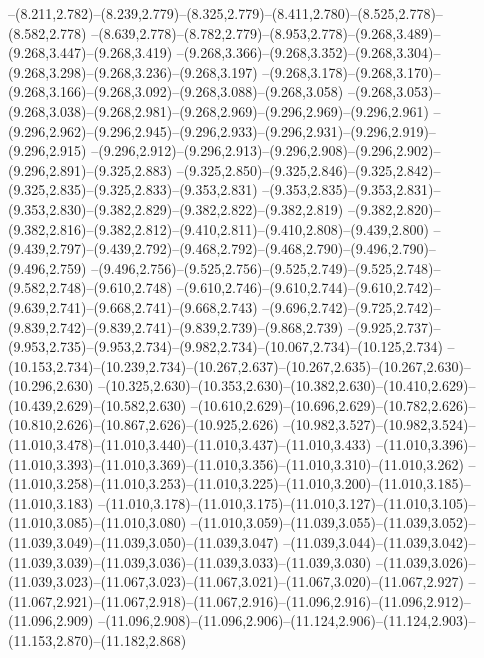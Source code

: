   --(8.211,2.782)--(8.239,2.779)--(8.325,2.779)--(8.411,2.780)--(8.525,2.778)--(8.582,2.778)%
  --(8.639,2.778)--(8.782,2.779)--(8.953,2.778)--(9.268,3.489)--(9.268,3.447)--(9.268,3.419)%
  --(9.268,3.366)--(9.268,3.352)--(9.268,3.304)--(9.268,3.298)--(9.268,3.236)--(9.268,3.197)%
  --(9.268,3.178)--(9.268,3.170)--(9.268,3.166)--(9.268,3.092)--(9.268,3.088)--(9.268,3.058)%
  --(9.268,3.053)--(9.268,3.038)--(9.268,2.981)--(9.268,2.969)--(9.296,2.969)--(9.296,2.961)%
  --(9.296,2.962)--(9.296,2.945)--(9.296,2.933)--(9.296,2.931)--(9.296,2.919)--(9.296,2.915)%
  --(9.296,2.912)--(9.296,2.913)--(9.296,2.908)--(9.296,2.902)--(9.296,2.891)--(9.325,2.883)%
  --(9.325,2.850)--(9.325,2.846)--(9.325,2.842)--(9.325,2.835)--(9.325,2.833)--(9.353,2.831)%
  --(9.353,2.835)--(9.353,2.831)--(9.353,2.830)--(9.382,2.829)--(9.382,2.822)--(9.382,2.819)%
  --(9.382,2.820)--(9.382,2.816)--(9.382,2.812)--(9.410,2.811)--(9.410,2.808)--(9.439,2.800)%
  --(9.439,2.797)--(9.439,2.792)--(9.468,2.792)--(9.468,2.790)--(9.496,2.790)--(9.496,2.759)%
  --(9.496,2.756)--(9.525,2.756)--(9.525,2.749)--(9.525,2.748)--(9.582,2.748)--(9.610,2.748)%
  --(9.610,2.746)--(9.610,2.744)--(9.610,2.742)--(9.639,2.741)--(9.668,2.741)--(9.668,2.743)%
  --(9.696,2.742)--(9.725,2.742)--(9.839,2.742)--(9.839,2.741)--(9.839,2.739)--(9.868,2.739)%
  --(9.925,2.737)--(9.953,2.735)--(9.953,2.734)--(9.982,2.734)--(10.067,2.734)--(10.125,2.734)%
  --(10.153,2.734)--(10.239,2.734)--(10.267,2.637)--(10.267,2.635)--(10.267,2.630)--(10.296,2.630)%
  --(10.325,2.630)--(10.353,2.630)--(10.382,2.630)--(10.410,2.629)--(10.439,2.629)--(10.582,2.630)%
  --(10.610,2.629)--(10.696,2.629)--(10.782,2.626)--(10.810,2.626)--(10.867,2.626)--(10.925,2.626)%
  --(10.982,3.527)--(10.982,3.524)--(11.010,3.478)--(11.010,3.440)--(11.010,3.437)--(11.010,3.433)%
  --(11.010,3.396)--(11.010,3.393)--(11.010,3.369)--(11.010,3.356)--(11.010,3.310)--(11.010,3.262)%
  --(11.010,3.258)--(11.010,3.253)--(11.010,3.225)--(11.010,3.200)--(11.010,3.185)--(11.010,3.183)%
  --(11.010,3.178)--(11.010,3.175)--(11.010,3.127)--(11.010,3.105)--(11.010,3.085)--(11.010,3.080)%
  --(11.010,3.059)--(11.039,3.055)--(11.039,3.052)--(11.039,3.049)--(11.039,3.050)--(11.039,3.047)%
  --(11.039,3.044)--(11.039,3.042)--(11.039,3.039)--(11.039,3.036)--(11.039,3.033)--(11.039,3.030)%
  --(11.039,3.026)--(11.039,3.023)--(11.067,3.023)--(11.067,3.021)--(11.067,3.020)--(11.067,2.927)%
  --(11.067,2.921)--(11.067,2.918)--(11.067,2.916)--(11.096,2.916)--(11.096,2.912)--(11.096,2.909)%
  --(11.096,2.908)--(11.096,2.906)--(11.124,2.906)--(11.124,2.903)--(11.153,2.870)--(11.182,2.868)%
